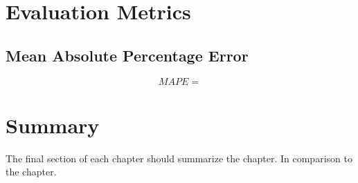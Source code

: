 



\section{Evaluation Metrics}
\label{sec:section_Example}

\subsection{Mean Absolute Percentage Error}

\begin{equation}
    MAPE = 
\end{equation}


\section{Summary}
\label{s:Background-Summary}

The final section of each chapter should summarize the chapter. In comparison to the chapter.

